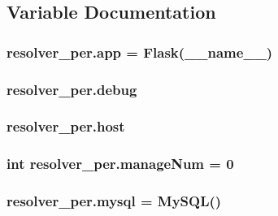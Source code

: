 \subsection{Variable Documentation}
\subsubsection[{\texorpdfstring{app}{app}}]{\setlength{\rightskip}{0pt plus 5cm}resolver\+\_\+per.\+app = Flask(\+\_\+\+\_\+name\+\_\+\+\_\+)}\hypertarget{namespaceresolver__per_a935a52010c287b6f5a4133476cca735d}{}\label{namespaceresolver__per_a935a52010c287b6f5a4133476cca735d}
\subsubsection[{\texorpdfstring{debug}{debug}}]{\setlength{\rightskip}{0pt plus 5cm}resolver\+\_\+per.\+debug}\hypertarget{namespaceresolver__per_a6279d1ec0660c5d906a9f87a3e81c7f4}{}\label{namespaceresolver__per_a6279d1ec0660c5d906a9f87a3e81c7f4}
\subsubsection[{\texorpdfstring{host}{host}}]{\setlength{\rightskip}{0pt plus 5cm}resolver\+\_\+per.\+host}\hypertarget{namespaceresolver__per_a3ed78c58e0622d2f75a22407ecf907bd}{}\label{namespaceresolver__per_a3ed78c58e0622d2f75a22407ecf907bd}
\subsubsection[{\texorpdfstring{manage\+Num}{manageNum}}]{\setlength{\rightskip}{0pt plus 5cm}int resolver\+\_\+per.\+manage\+Num = 0}\hypertarget{namespaceresolver__per_ab2a86a37929b5b79739f5287af715959}{}\label{namespaceresolver__per_ab2a86a37929b5b79739f5287af715959}
\subsubsection[{\texorpdfstring{mysql}{mysql}}]{\setlength{\rightskip}{0pt plus 5cm}resolver\+\_\+per.\+mysql = My\+S\+QL()}\hypertarget{namespaceresolver__per_a02391c09145731e1b228981b89257ebc}{}\label{namespaceresolver__per_a02391c09145731e1b228981b89257ebc}
